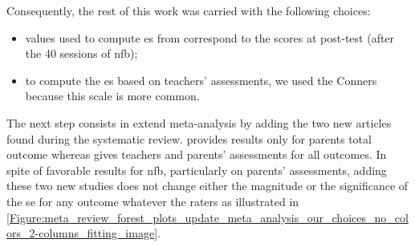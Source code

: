 \begin{table}[h!]
  \centering
  \caption{Comparison between \citet{Cortese2016} results obtained with RevMan \citep{RevMan} and those obtained with the Python code with our 
	choices applied. \glspl{se} and their corresponding p-value (in parenthesis) are presented. With the Python program, a negative \gls{se}
	is in favor of \gls{nfb}.}

  \label{Table:meta_review_comparison_revman_and_python_with_choices}
\end{table}

Consequently, the rest of this work was carried with the following choices:
\begin{itemize}
    \item values used to compute \gls{es} from \citeauthor{Arnold2014} correspond to the scores at post-test (after the 40 sessions of \gls{nfb});  
    \item to compute the \gls{es} based on teachers' assessments, we used the Conners because this scale is more common.
\end{itemize}

The next step consists in extend \citeauthor{Cortese2016} meta-analysis by adding the two new articles \citep{Strehl2017, Baumeister2016} found 
during the systematic review. \citet{Baumeister2016} provides results only for parents total outcome whereas \citet{Strehl2017} gives teachers 
and parents' assessments for all outcomes. In spite of favorable results for \gls{nfb}, particularly on parents' assessments, adding these two 
new studies does not change either the magnitude or the significance of the \gls{se} for any outcome whatever the raters
as illustrated in \cref{Figure:meta_review_forest_plots_update_meta_analysis_our_choices_no_colors_2-columns_fitting_image}. 
 

